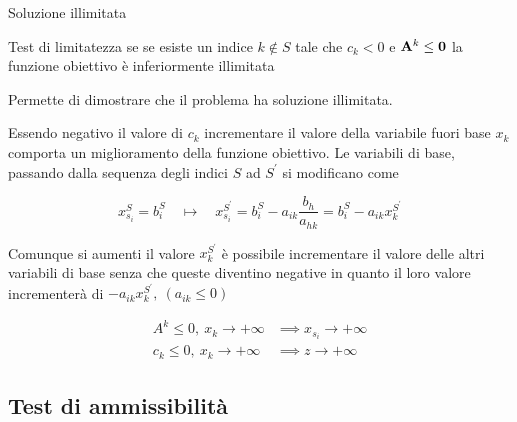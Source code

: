 \documentclass{beamer}
\begin{document}
\begin{frame}[allowframebreaks]{Soluzione illimitata}

\begin{block}{ Test di limitatezza}
se se esiste un indice $k \notin S$ tale che $c_k < 0$ e $\mathbf{A}^k \leq \mathbf{0}$ la funzione obiettivo \`e inferiormente illimitata
\end{block}

Permette di dimostrare che il problema ha soluzione illimitata.

Essendo negativo il valore di $c_k$ incrementare il valore della variabile fuori base $x_k$ comporta un miglioramento della funzione obiettivo.
Le variabili di base, passando dalla sequenza degli indici $S$ ad $S^\prime$ si modificano come

$$
x^S_{s_i} = b_{i}^S \quad\mapsto\quad x_{s_i}^{S^\prime}=b_i^S-a_{ik}\frac{b_h}{a_{hk}} =b_i^S-a_{ik} x^{S^\prime}_{k}
$$


Comunque si aumenti il valore $x^{S^\prime}_k$ \`e possibile incrementare il valore delle altri variabili
di base senza che queste diventino negative in quanto il loro valore incrementer\`a di
$ -a_{ik} x^{S^\prime}_k,\  (a_{ik} \leq 0)$

\begin{align}
A^k \leq 0,\ x_k \to +\infty &\implies x_{s_i} \to +\infty \nonumber\\
c_k \leq 0, \ x_k \to +\infty &\implies z \to +\infty \nonumber
\end{align}
\end{frame}

\subsection{Test di ammissibilit\`a}
\end{document}
